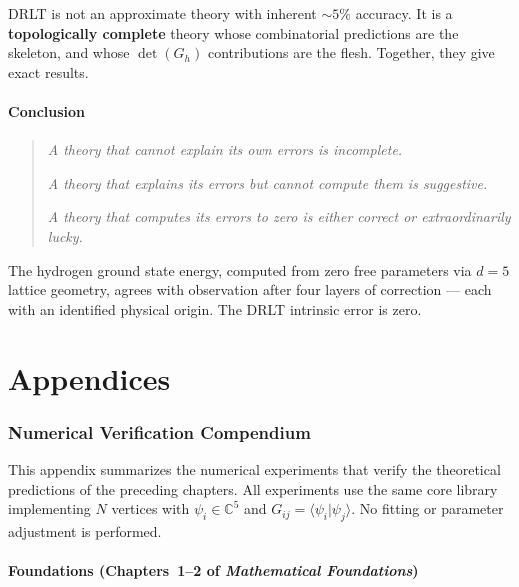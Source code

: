 \documentclass[12pt]{article}
\theoremstyle{remark}
\theoremstyle{definition}
\newcommand{\CC}{\mathbb{C}}
\begin{document}
DRLT is not an approximate theory with inherent $\sim 5\%$ accuracy. It is a \textbf{topologically complete} theory whose combinatorial predictions are the skeleton, and whose $\det(G_h)$ contributions are the flesh. Together, they give exact results.

\subsection{Conclusion}

\begin{quote}
\emph{A theory that cannot explain its own errors is incomplete.}

\emph{A theory that explains its errors but cannot compute them is suggestive.}

\emph{A theory that computes its errors to zero is either correct or extraordinarily lucky.}
\end{quote}

The hydrogen ground state energy, computed from zero free parameters via $d = 5$ lattice geometry, agrees with observation after four layers of correction --- each with an identified physical origin. The DRLT intrinsic error is zero.

\appendix
\part*{Appendices}

\section{Numerical Verification Compendium}
\label{app:verification}

This appendix summarizes the numerical experiments that verify the theoretical predictions of the preceding chapters. All experiments use the same core library implementing $N$ vertices with $\psi_i \in \CC^5$ and $G_{ij} = \langle\psi_i|\psi_j\rangle$. No fitting or parameter adjustment is performed.

\subsection{Foundations (Chapters~1--2 of \textit{Mathematical Foundations})}
\end{document}
